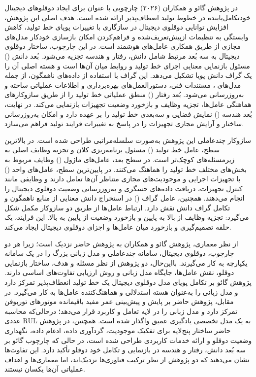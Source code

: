 در پژوهش
گائو و همکاران (۲۰۲۶)
\cite{gao2026selfevolving}
چارچوبی با عنوان
برای ایجاد دوقلوهای دیجیتال خودتکامل‌یابنده در خطوط تولید انعطاف‌پذیر
ارائه شده است. هدف اصلی این پژوهش، افزایش توانایی دوقلوی دیجیتال
در سازگاری با تغییرات پویای خط تولید، کاهش وابستگی به تنظیمات
ازپیش‌تعریف‌شده و فراهم‌کردن امکان بازسازی خودکار مدل‌های مجازی
از طریق همکاری عامل‌های هوشمند است.
در این چارچوب، ساختار دوقلوی دیجیتال به سه بُعد مرتبط شامل
دانش، رفتار و هندسه تجزیه می‌شود. بُعد دانش
()
 مسئول بازنمایی معنایی اجزای خط تولید
و روابط میان آن‌ها است و هسته اصلی آن را یک گراف دانش پویا
تشکیل می‌دهد. این گراف با استفاده از داده‌های ناهمگون، از جمله
مدل‌های ، مستندات فنی، دستورالعمل‌های بهره‌برداری
و اطلاعات عملیاتی ساخته و به‌روزرسانی می‌شود.
بُعد رفتار
()
منطق عملیاتی خط تولید را از طریق سازوکارهای هماهنگی عامل‌ها،
تجزیه وظایف و بازخورد وضعیت تجهیزات بازنمایی می‌کند.
در نهایت، بُعد هندسه
()
نمایش فضایی و سه‌بعدی خط تولید را بر عهده دارد و امکان
به‌روزرسانی ساختار و آرایش مجازی تجهیزات را در پاسخ به
تغییرات فرایند تولید فراهم می‌سازد.

سازوکار چندعاملی این پژوهش به‌صورت سلسله‌مراتبی طراحی شده است.
در بالاترین سطح، عامل خط تولید
()
مسئول برنامه‌ریزی کلان و تجزیه وظایف اصلی به زیرمسئله‌های
کوچک‌تر است. در سطح بعد، عامل‌های ماژول
()
وظایف مربوط به بخش‌های مختلف خط تولید را هماهنگ می‌کنند. در پایین‌ترین سطح،
عامل‌های واحد
()
با تجهیزات اجرایی و موجودیت‌های مجازی متناظر آن‌ها تعامل دارند
و وظایفی مانند کنترل تجهیزات، دریافت داده‌های حسگری و
به‌روزرسانی وضعیت دوقلوی دیجیتال را انجام می‌دهند.
همچنین، عامل گراف
()
در استخراج دانش معنایی از منابع ناهمگون و تکامل گراف دانش
نقش دارد. ارتباط عامل‌ها از طریق دو سازوکار مکمل شکل می‌گیرد:
تجزیه وظایف از بالا به پایین و بازخورد وضعیت از پایین به بالا.
این فرایند، یک حلقه تصمیم‌گیری و بازخورد میان عامل‌ها و
اجزای دوقلوی دیجیتال ایجاد می‌کند.

از نظر معماری، پژوهش گائو و همکاران به پژوهش حاضر نزدیک
است؛ زیرا هر دو چارچوب، دوقلوی دیجیتال، سامانه چندعاملی
و مدل زبانی بزرگ را در یک سامانه یکپارچه به کار می‌گیرند.
بااین‌حال، دو پژوهش از نظر مسئله و هدف، ساختار بازنمایی
دوقلو، نقش عامل‌ها، جایگاه مدل زبانی و روش ارزیابی
تفاوت‌های اساسی دارند. پژوهش گائو بر تکامل پویای مدل
دوقلوی دیجیتال یک خط تولید انعطاف‌پذیر تمرکز دارد و
مدل زبانی را به‌عنوان هسته استدلالی و هماهنگ‌کننده
عامل‌ها به کار می‌گیرد. در مقابل، پژوهش حاضر بر پایش
و پیش‌بینی عمر مفید باقیمانده موتورهای توربوفن تمرکز
دارد و مدل زبانی را در لایه تعامل و کاربرد قرار می‌دهد؛
درحالی‌که محاسبه عددی \gls{RUL} به یک مدل تخصصی
یادگیری عمیق واگذار شده است. همچنین، در پژوهش حاضر
ساختار پنج‌لایه برای تفکیک موجودیت، گردآوری داده،
ادغام داده، نگهداری وضعیت دوقلو و ارائه خدمات کاربردی
طراحی شده است، در حالی که چارچوب گائو بر سه بُعد
دانش، رفتار و هندسه در بازنمایی و تکامل خود دوقلو
تأکید دارد. این تفاوت‌ها نشان می‌دهند که دو پژوهش
از نظر ترکیب فناوری‌ها نزدیک‌اند، اما معماری‌ها و
اهداف عملیاتی آن‌ها یکسان نیستند.


